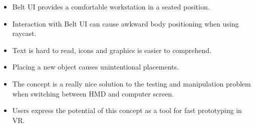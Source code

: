 \begin{itemize}
  \item Belt UI provides a comfortable workstation in a seated position.
  \item Interaction with Belt UI can cause awkward body positioning when using raycast.
  \item Text is hard to read, icons and graphics is easier to comprehend.
  \item Placing a new object causes unintentional placements.

  \item The concept is a really nice solution to the testing and manipulation problem when switching between HMD and computer screen.
  \item Users express the potential of this concept as a tool for fast prototyping in VR.

\end{itemize}
